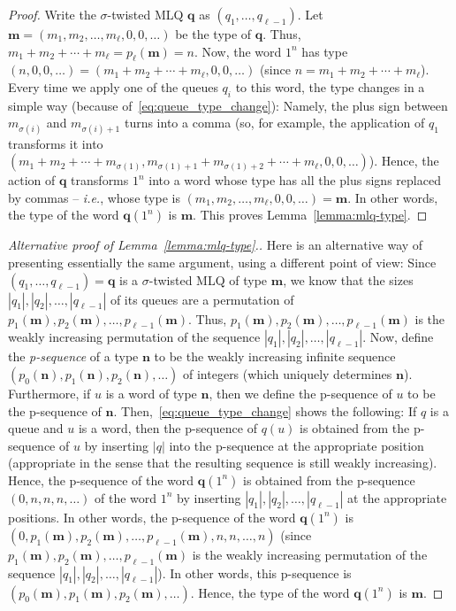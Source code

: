 \documentclass[reqno]{amsart}
\newcommand{\0}{\phantom{c}}
\newcommand{\mm}{\mathbf{m}}
\newcommand{\nn}{\mathbf{n}}
\newcommand{\qq}{\mathbf{q}}
\newenvironment{verlong}{}{}
\newcommand{\abs}[1]{\left| #1 \right|}
\newcommand{\tup}[1]{\left( #1 \right)}
\newcommand{\defn}[1]{{\color{darkred}\emph{#1}}} %
\theoremstyle{plain}
\theoremstyle{definition}
\numberwithin{equation}{section}
\begin{document}
\begin{verlong}
\begin{proof}
Write the $\sigma$-twisted MLQ $\qq$ as $\tup{q_1, \ldots, q_{\ell-1}}$.
Let $\mm = \tup{m_1, m_2, \ldots, m_\ell, 0, 0, \ldots}$ be the type of $\qq$.
Thus, $m_1 + m_2 + \cdots + m_\ell = p_{\ell}(\mm) = n$.
Now, the word $1^n$ has type $\tup{n, 0, 0, \ldots} = \tup{m_1 + m_2 + \cdots + m_\ell, 0, 0, \ldots}$
(since $n = m_1 + m_2 + \cdots + m_\ell$).
Every time we apply one of the queues $q_i$ to this word, the type changes in a simple way (because of~\eqref{eq:queue_type_change}): Namely, the plus sign between $m_{\sigma(i)}$ and $m_{\sigma(i)+1}$ turns into a comma (so, for example, the application of $q_1$ transforms it into $\tup{m_1 + m_2 + \cdots + m_{\sigma(1)}, m_{\sigma(1)+1} + m_{\sigma(1)+2} + \cdots + m_\ell, 0, 0, \ldots}$).
Hence, the action of $\qq$ transforms $1^n$ into a word whose type has all the plus signs replaced by commas -- \textit{i.e.}, whose type is $\tup{m_1, m_2, \ldots, m_\ell, 0, 0, \ldots} = \mm$.
In other words, the type of the word $\qq(1^n)$ is $\mm$.
This proves Lemma~\ref{lemma:mlq-type}.
\end{proof}

\begin{proof}[Alternative proof of Lemma~\ref{lemma:mlq-type}.]
Here is an alternative way of presenting essentially the same argument, using a different point of view:
Since $\tup{q_1, \ldots, q_{\ell-1}} = \qq$ is a $\sigma$-twisted MLQ of type $\mm$, we know that the sizes $\abs{q_1}, \abs{q_2}, \ldots, \abs{q_{\ell-1}}$ of its queues are a permutation of $p_1(\mm), p_2(\mm), \ldots, p_{\ell-1}(\mm)$.
Thus, $p_1(\mm), p_2(\mm), \ldots, p_{\ell-1}(\mm)$ is the weakly increasing permutation of the sequence $\abs{q_1}, \abs{q_2}, \ldots, \abs{q_{\ell-1}}$.
Now, define the \defn{p-sequence} of a type $\nn$ to be the weakly increasing infinite sequence $\tup{p_0(\nn), p_1(\nn), p_2(\nn), \ldots}$ of integers (which uniquely determines $\nn$).
Furthermore, if $u$ is a word of type $\nn$, then we define the p-sequence of $u$ to be the p-sequence of $\nn$.
Then,~\eqref{eq:queue_type_change} shows the following: If $q$ is a queue and $u$ is a word, then the p-sequence of $q(u)$ is obtained from the p-sequence of $u$ by inserting $\abs{q}$ into the p-sequence at the appropriate position (appropriate in the sense that the resulting sequence is still weakly increasing).
Hence, the p-sequence of the word $\qq (1^n)$ is obtained from the p-sequence $\tup{0, n, n, n, \ldots}$ of the word $1^n$ by inserting $\abs{q_1}, \abs{q_2}, \ldots, \abs{q_{\ell-1}}$ at the appropriate positions.
In other words, the p-sequence of the word $\qq (1^n)$ is $\tup{0, p_1(\mm), p_2(\mm), \ldots, p_{\ell-1}(\mm), n, n, \ldots, n}$ (since $p_1(\mm), p_2(\mm), \ldots, p_{\ell-1}(\mm)$ is the weakly increasing permutation of the sequence $\abs{q_1}, \abs{q_2}, \ldots, \abs{q_{\ell-1}}$).
In other words, this p-sequence is $\tup{p_0(\mm), p_1(\mm), p_2(\mm), \ldots}$.
Hence, the type of the word $\qq (1^n)$ is $\mm$.
\end{proof}
\end{verlong}
\end{document}
